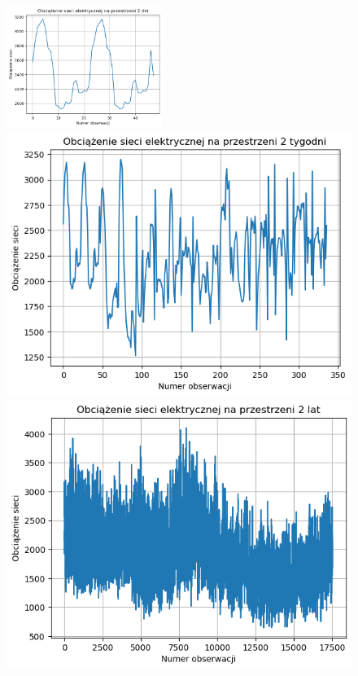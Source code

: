 \documentclass[11pt]{article}
\begin{document}
\begin{figure}[h!]
    \centering
    \includegraphics[width=0.45\textwidth]{../plots/dane_dwudniowe.png}
    
    \vspace{1cm}

    \begin{minipage}[b]{0.45\textwidth}
        \centering
        \includegraphics[width=\textwidth]{../plots/dane_dwutygodniowe.png}
    \end{minipage}
    \hfill
    \begin{minipage}[b]{0.45\textwidth}
        \centering
        \includegraphics[width=\textwidth]{../plots/dane_dwuletnie.png}

\end{minipage}
\end{figure}
\end{document}
